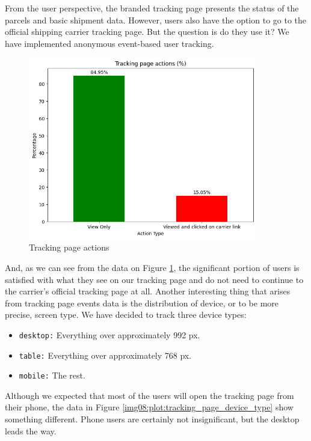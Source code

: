 From the user perspective, the branded tracking page presents the status of the parcels and basic shipment data.
However, users also have the option to go to the official shipping carrier tracking page.
But the question is do they use it?
We have implemented anonymous event-based user tracking.
\begin{figure}[H]\centering
\includegraphics[width=100mm]{img/chap08/tracking_page_events.png}
\caption{Tracking page actions}
\label{img08:plot:tracking_page_actions}
\end{figure}
And, as we can see from the data on Figure \ref{img08:plot:tracking_page_actions}, the significant portion of users is satisfied with what they see on our tracking page and do not need to continue to the carrier's official tracking page at all.
Another interesting thing that arises from tracking page events data is the distribution of device, or to be more precise, screen type.
We have decided to track three device types:
\begin{itemize}
    \item \texttt{desktop:} Everything over approximately 992 px.
    \item \texttt{table:} Everything over approximately 768 px.
    \item \texttt{mobile:} The rest.
\end{itemize}
Although we expected that most of the users will open the tracking page from their phone, the data in Figure \ref{img08:plot:tracking_page_device_type} show something different.
Phone users are certainly not insignificant, but the desktop leads the way.
